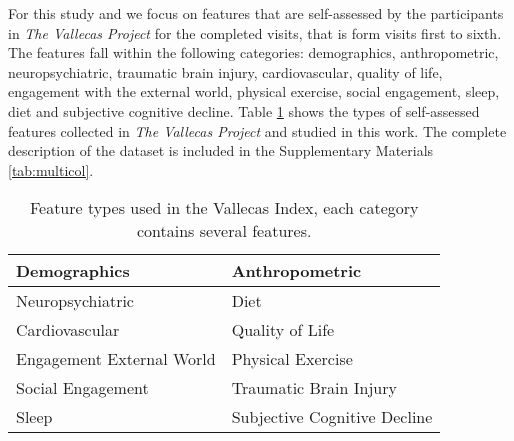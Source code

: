 \documentclass[preprint,12pt]{elsarticle}
\begin{document}
For this study and we focus on features that are self-assessed by the participants in \emph{The Vallecas Project} for the completed visits, that is form visits first to sixth. 
The features fall within the following categories: demographics, anthropometric, neuropsychiatric,  traumatic brain injury, cardiovascular, quality of life, engagement with the external world, physical exercise, social engagement, sleep, diet and subjective cognitive decline. Table \ref{tab:pvall} shows the types of self-assessed features collected in \emph{The Vallecas Project} and studied in this work. 
The complete description of the dataset is included in the Supplementary Materials \ref{tab:multicol}.

\begin{table}[h!]
  \begin{center}
   \caption{Feature types used in the Vallecas Index, each category contains several features.}
    \label{tab:pvall}
\begin{tabular}{ |p{6cm}||p{6cm}|  }
\hline
Demographics & Anthropometric\\
\hline
Neuropsychiatric & Diet\\
\hline
Cardiovascular & Quality of Life\\
\hline
Engagement External World & Physical Exercise\\
\hline
Social Engagement & Traumatic Brain Injury\\
\hline
Sleep & Subjective Cognitive Decline\\
\hline
\end{tabular}
\end{center}
\end{table}
\end{document}
